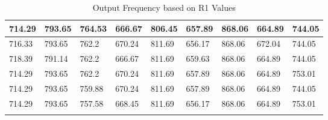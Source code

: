 \begin{longtable}{|l|l|l|l|l|l|l|l|l|}
		714.29   & 793.65  & 764.53  & 666.67  & 806.45 & 657.89  & 868.06   & 664.89  & 744.05  \\ \hline
		716.33   & 793.65  & 762.2   & 670.24  & 811.69 & 656.17  & 868.06   & 672.04  & 744.05  \\ \hline
		718.39   & 791.14  & 762.2   & 666.67  & 811.69 & 659.63  & 868.06   & 664.89  & 744.05  \\ \hline
		714.29   & 793.65  & 762.2   & 670.24  & 811.69 & 657.89  & 868.06   & 664.89  & 753.01  \\ \hline
		714.29   & 793.65  & 759.88  & 670.24  & 811.69 & 657.89  & 868.06   & 664.89  & 744.05  \\ \hline
		714.29   & 793.65  & 757.58  & 668.45  & 811.69 & 656.17  & 868.06   & 664.89  & 753.01  \\ \hline
		\caption{Output Frequency based on R1 Values}		\label{calibrationtable1}
	\end{longtable}
	
	
	

